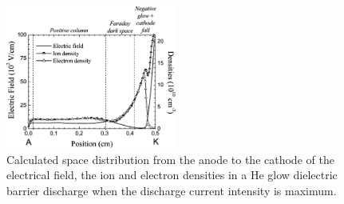 \documentclass[a4paper,10pt,twoside]{article}
\begin{document}
		\twocolumn

			\begin{figure}
				\centering
				\includegraphics[width=0.5\textwidth]{figures/lineratio/massinesp3fig5.pdf}
				\caption{Calculated space distribution from the anode to the cathode of	the electrical field, the ion and electron densities in a He glow dielectric barrier discharge when the discharge current intensity is maximum. \cite{Massines}}
				\label{img:massines}
			\end{figure}
\end{document}
